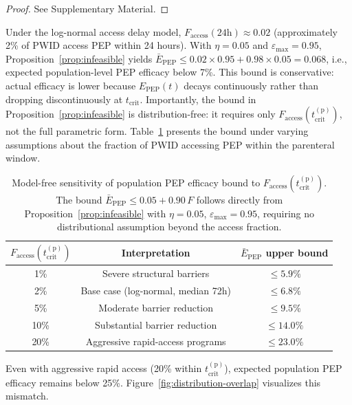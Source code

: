 \documentclass[12pt,a4paper]{article}
\theoremstyle{plain}
\theoremstyle{definition}
\theoremstyle{remark}
\newcommand{\Epep}{E_{\mathrm{PEP}}}
\newcommand{\tcrit}{t_{\mathrm{crit}}}
\begin{document}
\begin{proof}
See Supplementary Material.
\end{proof}


Under the log-normal access delay model, $F_{\mathrm{access}}(24\text{h}) \approx 0.02$ (approximately 2\% of PWID access PEP within 24 hours). With $\eta = 0.05$ and $\varepsilon_{\max} = 0.95$, Proposition~\ref{prop:infeasible} yields $\bar{E}_{\mathrm{PEP}} \leq 0.02 \times 0.95 + 0.98 \times 0.05 = 0.068$, i.e., expected population-level PEP efficacy below 7\%. This bound is conservative: actual efficacy is lower because $\Epep(t)$ decays continuously rather than dropping discontinuously at $\tcrit$. Importantly, the bound in Proposition~\ref{prop:infeasible} is distribution-free: it requires only $F_{\mathrm{access}}(\tcrit^{(\mathrm{p})})$, not the full parametric form. Table~\ref{tab:scenarios} presents the bound under varying assumptions about the fraction of PWID accessing PEP within the parenteral window.

\begin{table}[htbp]
\centering
\caption{Model-free sensitivity of population PEP efficacy bound to $F_{\mathrm{access}}(\tcrit^{(\mathrm{p})})$. The bound $\bar{E}_{\mathrm{PEP}} \leq 0.05 + 0.90\,F$ follows directly from Proposition~\ref{prop:infeasible} with $\eta = 0.05$, $\varepsilon_{\max} = 0.95$, requiring no distributional assumption beyond the access fraction.}\label{tab:scenarios}
\begin{tabular}{ccc}
\toprule
$F_{\mathrm{access}}(\tcrit^{(\mathrm{p})})$ & Interpretation & $\bar{E}_{\mathrm{PEP}}$ upper bound \\
\midrule
1\% & Severe structural barriers & $\leq 5.9\%$ \\
2\% & Base case (log-normal, median 72h) & $\leq 6.8\%$ \\
5\% & Moderate barrier reduction & $\leq 9.5\%$ \\
10\% & Substantial barrier reduction & $\leq 14.0\%$ \\
20\% & Aggressive rapid-access programs & $\leq 23.0\%$ \\
\bottomrule
\end{tabular}
\end{table}

\noindent Even with aggressive rapid access (20\% within $\tcrit^{(\mathrm{p})}$), expected population PEP efficacy remains below 25\%. Figure~\ref{fig:distribution-overlap} visualizes this mismatch.
\end{document}
